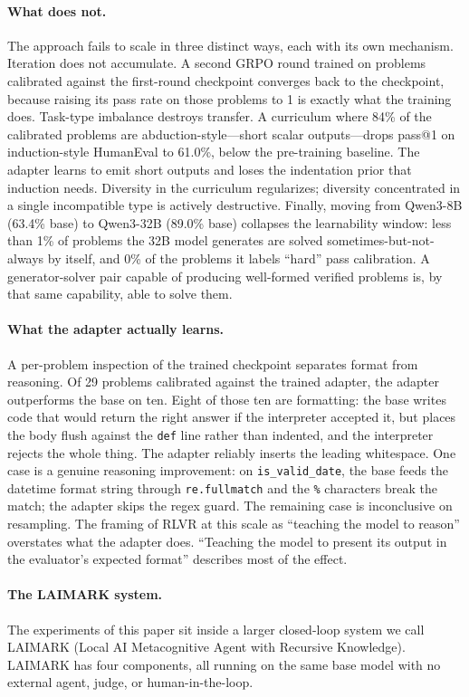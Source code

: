 \documentclass[11pt,a4paper]{article}
\begin{document}
\paragraph{What does not.}
The approach fails to scale in three distinct ways, each with its own mechanism.
Iteration does not accumulate.
A second GRPO round trained on problems calibrated against the first-round checkpoint converges back to the checkpoint, because raising its pass rate on those problems to 1 is exactly what the training does.
Task-type imbalance destroys transfer.
A curriculum where 84\% of the calibrated problems are abduction-style---short scalar outputs---drops pass@1 on induction-style HumanEval to 61.0\%, below the pre-training baseline.
The adapter learns to emit short outputs and loses the indentation prior that induction needs.
Diversity in the curriculum regularizes; diversity concentrated in a single incompatible type is actively destructive.
Finally, moving from Qwen3-8B (63.4\% base) to Qwen3-32B (89.0\% base) collapses the learnability window: less than 1\% of problems the 32B model generates are solved sometimes-but-not-always by itself, and 0\% of the problems it labels ``hard'' pass calibration.
A generator-solver pair capable of producing well-formed verified problems is, by that same capability, able to solve them.

\paragraph{What the adapter actually learns.}
A per-problem inspection of the trained checkpoint separates format from reasoning.
Of 29 problems calibrated against the trained adapter, the adapter outperforms the base on ten.
Eight of those ten are formatting: the base writes code that would return the right answer if the interpreter accepted it, but places the body flush against the \texttt{def} line rather than indented, and the interpreter rejects the whole thing.
The adapter reliably inserts the leading whitespace.
One case is a genuine reasoning improvement: on \texttt{is\_valid\_date}, the base feeds the datetime format string through \texttt{re.fullmatch} and the \texttt{\%} characters break the match; the adapter skips the regex guard.
The remaining case is inconclusive on resampling.
The framing of RLVR at this scale as ``teaching the model to reason'' overstates what the adapter does.
``Teaching the model to present its output in the evaluator's expected format'' describes most of the effect.

\paragraph{The LAIMARK system.}
The experiments of this paper sit inside a larger closed-loop system we call LAIMARK (Local AI Metacognitive Agent with Recursive Knowledge).
LAIMARK has four components, all running on the same base model with no external agent, judge, or human-in-the-loop.
\end{document}
